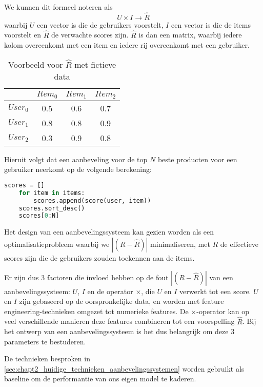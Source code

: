 We kunnen dit formeel noteren als
\begin{equation}
U \times I \rightarrow \hat{R}
\label{def:chap2_aanbevelingssysteem_formeel}    
\end{equation}
waarbij $U$ een vector is die de gebruikers voorstelt, $I$ een vector is die de items voorstelt en $\hat{R}$ de verwachte scores zijn. \cite{cursus_hs2} $\hat{R}$ is dan een matrix, waarbij iedere kolom overeenkomt met een item en iedere rij overeenkomt met een gebruiker.

\begin{table}[H]
\centering
\begin{tabular}{c|ccc}
        & $Item_0$ & $Item_1$ & $Item_2$ \\ \hline
$User_0$ & 0.5     & 0.6     & 0.7     \\
$User_1$ & 0.8     & 0.8     & 0.9     \\
$User_2$ & 0.3     & 0.9     & 0.8    
\end{tabular}
\caption{Voorbeeld voor $\hat{R}$ met fictieve data}
\end{table}

Hieruit volgt dat een aanbeveling voor de top $N$ beste producten voor een gebruiker neerkomt op de volgende berekening:
\begin{lstlisting}[language=python]
    scores = []
    for item in items:
        scores.append(score(user, item))
    scores.sort_desc()
    scores[0:N]
\end{lstlisting}

Het design van een aanbevelingssysteem kan gezien worden als een optimalisatieprobleem waarbij we $|(R - \hat{R})|$ minimaliseren, met $R$ de effectieve scores zijn die de gebruikers zouden toekennen aan de items.

Er zijn dus 3 factoren die invloed hebben op de fout $|(R - \hat{R})|$ van een aanbevelingssysteem: $U$, $I$ en de operator $\times$, die $U$ en $I$ verwerkt tot een score. $U$ en $I$ zijn gebaseerd op de oorspronkelijke data, en worden met feature engineering-technieken omgezet tot numerieke features. De $\times$-operator kan op veel verschillende manieren deze features combineren tot een voorspelling $\hat{R}$. Bij het ontwerp van een aanbevelingssysteem is het dus belangrijk om deze 3 parameters te bestuderen.

De technieken besproken in \autoref{sec:chapt2_huidige_technieken_aanbevelingssystemen} worden gebruikt als baseline om de performantie van ons eigen model te kaderen.


